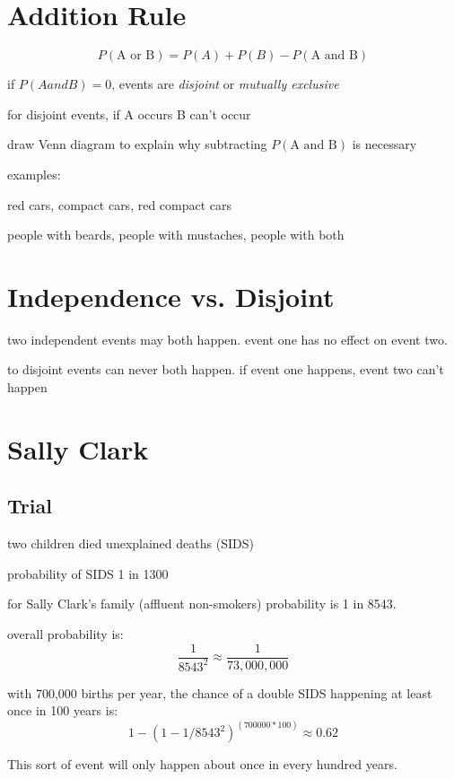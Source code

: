 \documentclass[landscape]{exam}
\begin{document}
  \section{Addition Rule}

  \[
    P(\text{A or B}) = P(A) + P(B) - P(\text{A and B})
  \]

  \begin{itemize*}
    \item if $P(A and B) = 0$, events are {\em disjoint} or {\em mutually
      exclusive}
    \item for disjoint events, if A occurs B can't occur
    \item draw Venn diagram to explain why subtracting $P(\text{A and B})$ is
      necessary
  \end{itemize*}

  examples:
  \begin{itemize*}
    \item red cars, compact cars, red compact cars
    \item people with beards, people with mustaches, people with both
  \end{itemize*}

  \section{Independence vs. Disjoint}
  \begin{itemize*}
    \item two independent events may both happen. event one has no effect on
      event two.

    \item to disjoint events can never both happen. if event one happens, event
      two can't happen

  \end{itemize*}

  \section{Sally Clark}

  \subsection{Trial}
  \begin{itemize*}
    \item two children died unexplained deaths (SIDS)
    \item probability of SIDS 1 in 1300
    \item for Sally Clark's family (affluent non-smokers) probability is 1 in
      8543.
    \item overall probability is:
      \[
        \frac{1}{8543^2} \approx \frac{1}{73,000,000}
      \]

    \item with 700,000 births per year, the chance of a double SIDS happening at
      least once in 100 years is:
      \[
        1 - (1 - 1/8543^2)^(700000 * 100) \approx 0.62
      \]

      This sort of event will only happen about once in every hundred years.
  \end{itemize*}
\end{document}
